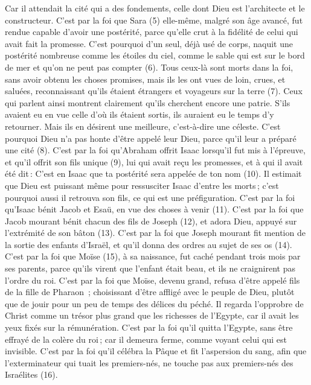 \begin{multicols}{2}
Car il attendait la cité qui a des fondements, celle dont Dieu est l'architecte et le constructeur.
C’est par la foi que Sara (5) elle-même, malgré son âge avancé, fut rendue capable d’avoir une postérité, parce qu’elle crut à la fidélité de celui qui avait fait la promesse.
C'est pourquoi d'un seul, déjà usé de corps, naquit une postérité nombreuse comme les étoiles du ciel, comme le sable qui est sur le bord de mer et qu’on ne peut pas compter (6).
Tous ceux-là sont morts dans la foi, sans avoir obtenu les choses promises, mais ils les ont vues de loin, crues, et saluées, reconnaissant qu'ils étaient étrangers et voyageurs sur la terre (7).
Ceux qui parlent ainsi montrent clairement qu'ils cherchent encore une patrie.
S’ils avaient eu en vue celle d’où ils étaient sortis, ils auraient eu le temps d’y retourner.
Mais ils en désirent une meilleure, c'est-à-dire une céleste. C’est pourquoi Dieu n’a pas honte d'être appelé leur Dieu, parce qu'il leur a préparé une cité (8).
C’est par la foi qu’Abraham offrit Isaac lorsqu’il fut mis à l’épreuve, et qu’il offrit son fils unique (9), lui qui avait reçu les promesses,
et à qui il avait été dit : C’est en Isaac que ta postérité sera appelée de ton nom (10).
Il estimait que Dieu est puissant même pour ressusciter Isaac d'entre les morts ; c'est pourquoi aussi il retrouva son fils, ce qui est une préfiguration.
C’est par la foi qu’Isaac bénit Jacob et Esaü, en vue des choses à venir (11).
C’est par la foi que Jacob mourant bénit chacun des fils de Joseph (12), et adora Dieu, appuyé sur l’extrémité de son bâton (13).
C’est par la foi que Joseph mourant fit mention de la sortie des enfants d'Israël, et qu’il donna des ordres au sujet de ses os (14).
C’est par la foi que Moïse (15), à sa naissance, fut caché pendant trois mois par ses parents, parce qu’ils virent que l’enfant était beau, et ils ne craignirent pas l’ordre du roi.
C’est par la foi que Moïse, devenu grand, refusa d'être appelé fils de la fille de Pharaon ;
choisissant d’être affligé avec le peuple de Dieu, plutôt que de jouir pour un peu de temps des délices du péché.
Il regarda l'opprobre de Christ comme un trésor plus grand que les richesses de l'Egypte, car il avait les yeux fixés sur la rémunération.
C’est par la foi qu’il quitta l'Egypte, sans être effrayé de la colère du roi ; car il demeura ferme, comme voyant celui qui est invisible.
C’est par la foi qu’il célébra la Pâque et fit l'aspersion du sang, afin que l’exterminateur qui tuait les premiers-nés, ne touche pas aux premiers-nés des Israélites (16).

\end{multicols}
